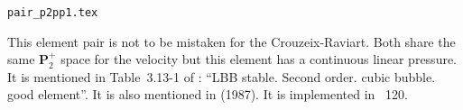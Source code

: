 \begin{flushright} {\tiny {\color{gray} \tt  pair\_p2pp1.tex}} \end{flushright}

This element pair is not to be mistaken for the Crouzeix-Raviart. Both share the same ${\bm P}_2^+$ space
for the velocity but this element has a continuous linear pressure.  
It is mentioned in Table~3.13-1 of \textcite{grsa}: ``LBB stable. Second order. cubic bubble. good element''.
It is also mentioned in \textcite{sofo87} (1987).
It is implemented in \stone~120.
